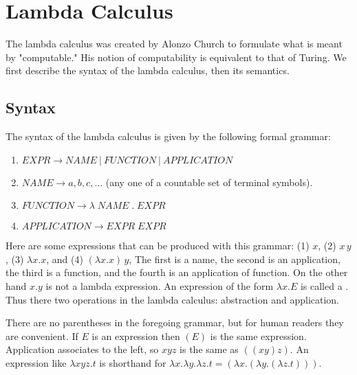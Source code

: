 
\section{Lambda Calculus}


\innertableofcontents

The lambda calculus was created by Alonzo Church to formulate what is meant by "computable."  His notion of computability is equivalent to that of Turing.   We first describe the syntax of the lambda calculus, then its semantics.


\subsection{Syntax}

The syntax of the lambda calculus is given by the following formal grammar:

\begin{enumerate}

\item $EXPR \to NAME\ |\ FUNCTION\ |\ APPLICATION$

\item $NAME \to a, b, c, \ldots$ (any one of a countable set of terminal symbols).

\item $FUNCTION \to\lambda\; NAME\; .\; EXPR$

\item $APPLICATION \to EXPR\; EXPR$

\end{enumerate}

Here are some expressions that can be produced with this grammar: (1) $x$, (2) $x\, y$, (3) $\lambda x.x$, and (4) $(\lambda x.x)\,y$, The first is a name, the second is an application, the third is a function, and the fourth is an application of function.  On the other hand $x . y$ is not a lambda expression.  An expression of the form $\lambda x.E$ is called a .  Thus there two operations in the lambda calculus: abstraction and application.

There are no parentheses in the foregoing grammar, but for human readers they are convenient. If $E$ is an expression then $(E)$ is the same expression.  Application associates to the left, so $xyz$ is the same as $((xy)z)$.  An expression like $\lambda xyz.t$ is shorthand for $\lambda x. \lambda y. \lambda z.t = (\lambda x. (\lambda y. (\lambda z.t)))$.

